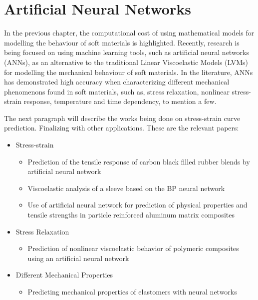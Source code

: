 \section{Artificial Neural Networks}

In the previous chapter, the computational cost of using mathematical models for modelling the behaviour of soft materials is highlighted. Recently, research is being focused on using machine learning tools, such as artificial neural networks (ANNs), as an alternative to the traditional Linear Viscoelastic Models (LVMs) for modelling the mechanical behaviour of soft materials. In the literature, ANNs has demonstrated high accuracy when characterizing different mechanical phenomenons found in soft materials, such as, stress relaxation, nonlinear stress-strain response, temperature  and time dependency, to mention a few.

The next paragraph will describe the works being done on stress-strain curve prediction. Finalizing with other applications. These are the relevant papers:

\begin{itemize}
    \item Stress-strain
    \begin{itemize}
        \item Prediction of the tensile response of carbon black filled rubber blends by artificial neural network
        \item Viscoelastic analysis of a sleeve based on the BP neural network
        \item Use of artificial neural network for prediction of physical properties and tensile strengths in particle reinforced aluminum matrix composites
    \end{itemize}
    \item Stress Relaxation
    \begin{itemize}
        \item Prediction of nonlinear viscoelastic behavior of polymeric composites using an artificial neural network
    \end{itemize}
    \item Different Mechanical Properties
    \begin{itemize}
        \item Predicting mechanical properties of elastomers with neural networks
    \end{itemize}
\end{itemize}

